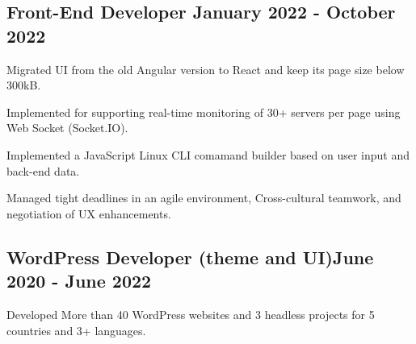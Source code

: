\subsection{{Front-End Developer \hfill January 2022 - October 2022}}
\begin{zitemize}

             \item{
                Migrated UI from the old Angular version to React and keep its page size below 300kB.}
             \item{
                Implemented for supporting real-time monitoring of 30+ servers per page using Web Socket (Socket.IO).}
             \item{
               Implemented a JavaScript Linux CLI comamand builder based on user input and back-end data.}

             \item{
               Managed tight deadlines in an agile environment, Cross-cultural teamwork, and negotiation of UX enhancements.
}
\end{zitemize}

\subsection{{WordPress Developer (theme and UI)\hfill June 2020 - June 2022}}
\begin{zitemize}

             \item{
                Developed More than 40 WordPress websites and 3 headless projects for 5 countries and 3+ languages.}
\end{zitemize}


